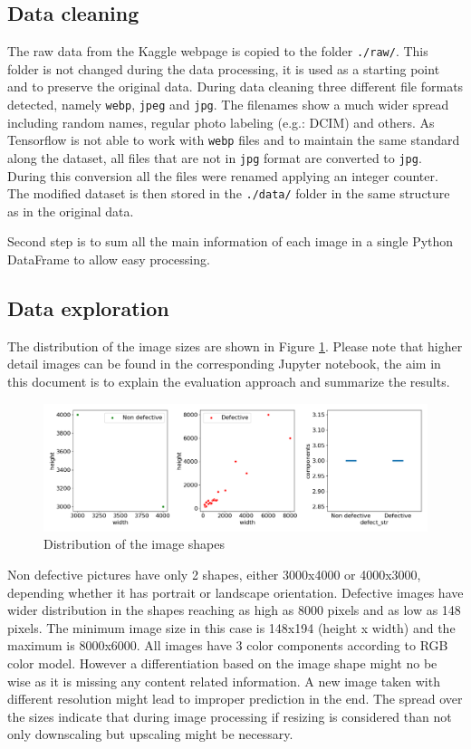 \documentclass[10pt, final]{article}
\begin{document}
\subsection{Data cleaning}
The raw data from the Kaggle webpage \cite{noauthor_railway_nodate} is copied to the folder \lstinline{./raw/}.
This folder is not changed during the data processing, it is used as a starting point and to preserve the
original data.
During data cleaning three different file formats detected, namely \lstinline{webp}, \lstinline{jpeg}
and \lstinline{jpg}.
The filenames show a much wider spread including random names, regular photo labeling (e.g.: DCIM) and others.
As Tensorflow is not able to work with \lstinline{webp} files and to maintain the same standard along
the dataset, all files that are not in \lstinline{jpg} format are converted to \lstinline{jpg}.
During this conversion all the files were renamed applying an integer counter.
The modified dataset is then stored in the \lstinline{./data/} folder in the same structure as in the original data.

Second step is to sum all the main information of each image in a single Python DataFrame to allow easy processing.

\subsection{Data exploration} \label{sec:data_exploration}
The distribution of the image sizes are shown in Figure \ref{fig:shape_dist}.
Please note that higher detail images can be found in the corresponding Jupyter notebook, the aim in this document
is to explain the evaluation approach and summarize the results.

\begin{figure}[!ht]
	\centering
	\includegraphics[width=\textwidth]{./tex_graphs/shapes.png}
	\caption{Distribution of the image shapes}
	\label{fig:shape_dist}
\end{figure}

Non defective pictures have only 2 shapes, either 3000x4000 or 4000x3000, depending whether it has
portrait or landscape orientation.
Defective images have wider distribution in the shapes reaching as high as 8000 pixels and as low as 148 pixels.
The minimum image size in this case is 148x194 (height x width) and the maximum is 8000x6000.
All images have 3 color components according to RGB color model.
However a differentiation based on the image shape might no be wise as it is missing any content related information.
A new image taken with different resolution might lead to improper prediction in the end.
The spread over the sizes indicate that during image processing if resizing is considered than not only
downscaling but upscaling might be necessary.
\end{document}
